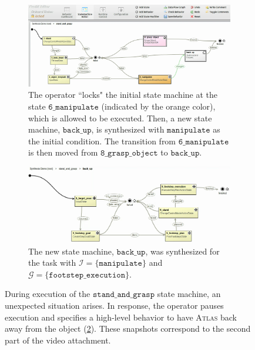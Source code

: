 \begin{figure}[t]
	\centering
	\begin{subfigure}[b]{0.99\columnwidth}
	\includegraphics[width=0.99\columnwidth, clip]{./img/synthesis_runtime_connect_sm.png}
	\caption{The operator ``locks" the initial state machine at the state $\mathtt{6\_manipulate}$ (indicated by the orange color), which is allowed to be executed.
	Then, a new state machine, $\mathtt{back\_up}$, is synthesized with $\mathtt{manipulate}$ as the initial condition.
	The transition from $\mathtt{6\_manipulate}$ is then moved from $\mathtt{8\_grasp\_object}$ to $\mathtt{back\_up}$.
	} 
	\label{Fig:runtime1}
	\end{subfigure}
	
	\vspace{4 pt}
	\begin{subfigure}[b]{0.99\columnwidth}
	\includegraphics[width=0.99\columnwidth, clip]{./img/synthesis_runtime_synthesized_sm.png}
	\caption{The new state machine, $\mathtt{back\_up}$, was synthesized for the task with $\mathcal{I} = \{ \mathtt{manipulate} \}$ and $\mathcal{G} = \{ \mathtt{footstep\_execution} \}$.
	} 
	\label{Fig:runtime2}
	\end{subfigure}
	\caption{During execution of the $\mathtt{stand\_and\_grasp}$ state machine, an unexpected situation arises.
	In response, the operator pauses execution and specifies a high-level behavior to have \textsc{Atlas} back away from the object (\ref{Fig:runtime2}).
	These snapshots correspond to the second part of the video attachment.
	}
	\label{Fig:synthesis_runtime_demo}
\end{figure}

